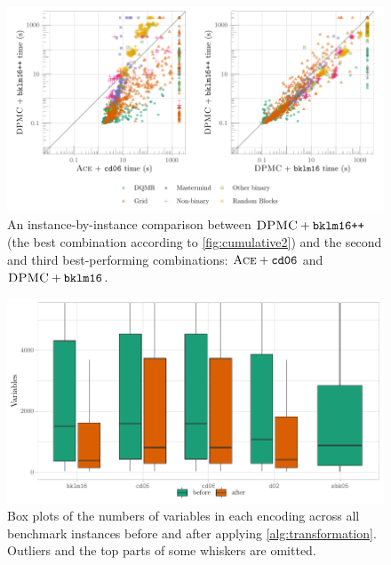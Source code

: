 \begin{figure}[t]
  \centering
  \includegraphics[width=\textwidth]{chapters/wmc_without_parameters/scatter}
  \caption{An instance-by-instance comparison between $\textsc{DPMC} +
    \texttt{bklm16++}$ (the best combination according to \cref{fig:cumulative2})
  and the second and third best-performing combinations: $\textsc{Ace} +
  \texttt{cd06}$ and $\textsc{DPMC} + \texttt{bklm16}$.}\label{fig:scatter2}
\end{figure}

\begin{figure}[t]
  \centering
  \includegraphics[width=\textwidth]{chapters/wmc_without_parameters/box}
  \caption{Box plots of the numbers of variables in each encoding across all
    benchmark instances before and after applying \cref{alg:transformation}.
    Outliers and the top parts of some whiskers are omitted.}\label{fig:box}
\end{figure}


